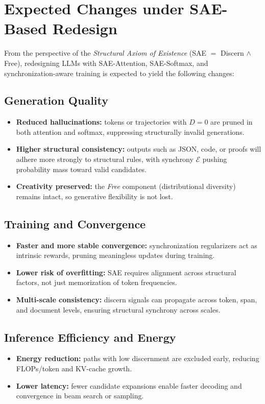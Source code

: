 \documentclass[11pt]{article}
\theoremstyle{plain}
\theoremstyle{definition}
\theoremstyle{remark}
\begin{document}
\newpage
\section{Expected Changes under SAE-Based Redesign}

From the perspective of the \emph{Structural Axiom of Existence} (SAE $=$ Discern $\wedge$ Free), redesigning LLMs with SAE-Attention, SAE-Softmax, and synchronization-aware training is expected to yield the following changes:

\subsection{Generation Quality}
\begin{itemize}
  \item \textbf{Reduced hallucinations:} tokens or trajectories with $D=0$ are pruned in both attention and softmax, suppressing structurally invalid generations.
  \item \textbf{Higher structural consistency:} outputs such as JSON, code, or proofs will adhere more strongly to structural rules, with synchrony $\mathcal{E}$ pushing probability mass toward valid candidates.
  \item \textbf{Creativity preserved:} the \emph{Free} component (distributional diversity) remains intact, so generative flexibility is not lost.
\end{itemize}

\subsection{Training and Convergence}
\begin{itemize}
  \item \textbf{Faster and more stable convergence:} synchronization regularizers act as intrinsic rewards, pruning meaningless updates during training.
  \item \textbf{Lower risk of overfitting:} SAE requires alignment across structural factors, not just memorization of token frequencies.
  \item \textbf{Multi-scale consistency:} discern signals can propagate across token, span, and document levels, ensuring structural synchrony across scales.
\end{itemize}

\subsection{Inference Efficiency and Energy}
\begin{itemize}
  \item \textbf{Energy reduction:} paths with low discernment are excluded early, reducing FLOPs/token and KV-cache growth.
  \item \textbf{Lower latency:} fewer candidate expansions enable faster decoding and convergence in beam search or sampling.
\end{itemize}
\end{document}
